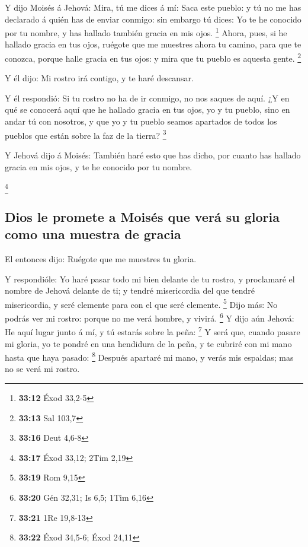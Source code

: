  Y dijo Moisés á Jehová: Mira, tú me dices á mí: Saca este
pueblo: y tú no me has declarado á quién has de enviar conmigo: sin
embargo tú dices: Yo te he conocido por tu nombre, y has hallado también
gracia en mis ojos. \footnote{\textbf{33:12} Éxod 33,2-5} 
Ahora, pues, si he hallado gracia en tus ojos, ruégote que me muestres
ahora tu camino, para que te conozca, porque halle gracia en tus ojos: y
mira que tu pueblo es aquesta gente. \footnote{\textbf{33:13} Sal 103,7}

 Y él dijo: Mi rostro irá contigo, y te haré descansar.

 Y él respondió: Si tu rostro no ha de ir conmigo, no nos
saques de aquí.  ¿Y en qué se conocerá aquí que he hallado
gracia en tus ojos, yo y tu pueblo, sino en andar tú con nosotros, y que
yo y tu pueblo seamos apartados de todos los pueblos que están sobre la
faz de la tierra? \footnote{\textbf{33:16} Deut 4,6-8}

 Y Jehová dijo á Moisés: También haré esto que has dicho,
por cuanto has hallado gracia en mis ojos, y te he conocido por tu
nombre.

\footnote{\textbf{33:17} Éxod 33,12; 2Tim 2,19}

\hypertarget{dios-le-promete-a-moisuxe9s-que-veruxe1-su-gloria-como-una-muestra-de-gracia}{%
\subsection{Dios le promete a Moisés que verá su gloria como una muestra
de
gracia}\label{dios-le-promete-a-moisuxe9s-que-veruxe1-su-gloria-como-una-muestra-de-gracia}}

 El entonces dijo: Ruégote que me muestres tu gloria.

 Y respondióle: Yo haré pasar todo mi bien delante de tu
rostro, y proclamaré el nombre de Jehová delante de ti; y tendré
misericordia del que tendré misericordia, y seré clemente para con el
que seré clemente. \footnote{\textbf{33:19} Rom 9,15}  Dijo
más: No podrás ver mi rostro: porque no me verá hombre, y vivirá.
\footnote{\textbf{33:20} Gén 32,31; Is 6,5; 1Tim 6,16}  Y
dijo aún Jehová: He aquí lugar junto á mí, y tú estarás sobre la peña:
\footnote{\textbf{33:21} 1Re 19,8-13}  Y será que, cuando
pasare mi gloria, yo te pondré en una hendidura de la peña, y te cubriré
con mi mano hasta que haya pasado: \footnote{\textbf{33:22} Éxod 34,5-6;
  Éxod 24,11}  Después apartaré mi mano, y verás mis
espaldas; mas no se verá mi rostro.

